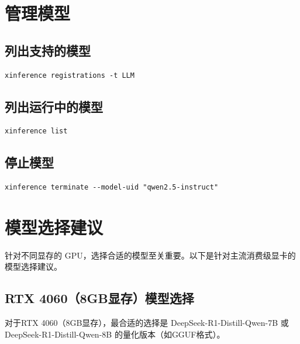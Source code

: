 \documentclass[12pt,UTF8]{ctexbook}
\begin{document}
\section{管理模型}
\label{sec:manage_models}

\subsection{列出支持的模型}

\begin{lstlisting}
xinference registrations -t LLM
\end{lstlisting}

\subsection{列出运行中的模型}

\begin{lstlisting}
xinference list
\end{lstlisting}

\subsection{停止模型}

\begin{lstlisting}
xinference terminate --model-uid "qwen2.5-instruct"
\end{lstlisting}

\section{模型选择建议}
\label{sec:model_selection}

针对不同显存的 GPU，选择合适的模型至关重要。以下是针对主流消费级显卡的模型选择建议。

\subsection{RTX 4060（8GB显存）模型选择}

对于RTX 4060（8GB显存），最合适的选择是 DeepSeek-R1-Distill-Qwen-7B 或 DeepSeek-R1-Distill-Qwen-8B 的量化版本（如GGUF格式）。
\end{document}
